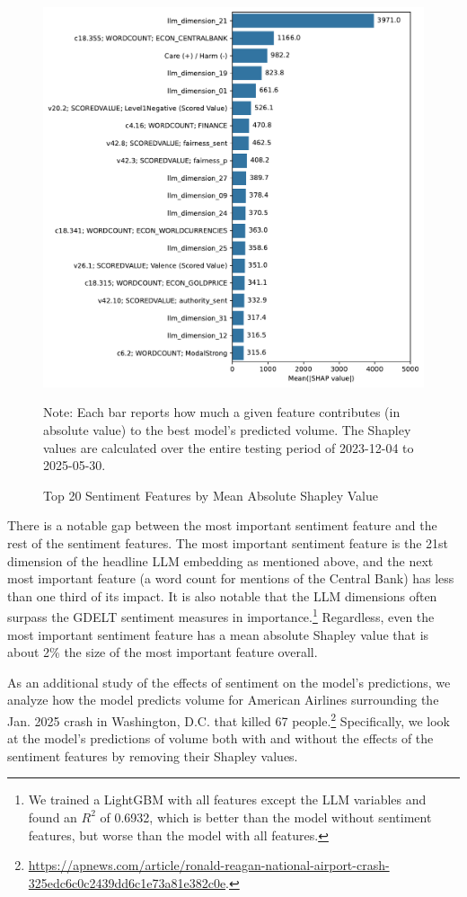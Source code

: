 \documentclass[12pt]{article}
\begin{document}
\begin{figure}[H]
    \centering
    \caption{Top 20 Sentiment Features by Mean Absolute Shapley Value}
    \includegraphics[width=0.75\linewidth]{../Output/shap_abs_sentiment_top20.pdf}
    \begin{minipage}{0.75\linewidth}
        \footnotesize
        \singlespacing
        Note: Each bar reports how much a given feature contributes (in absolute value) to the best model's predicted volume. The Shapley values are calculated over the entire testing period of 2023-12-04 to 2025-05-30.
    \end{minipage}
    \label{fig:shapley_sentiment_top20}
\end{figure}

There is a notable gap between the most important sentiment feature and the rest of the sentiment features. The most important sentiment feature is the 21st dimension of the headline LLM embedding as mentioned above, and the next most important feature (a word count for mentions of the Central Bank) has less than one third of its impact. It is also notable that the LLM dimensions often surpass the GDELT sentiment measures in importance.\footnote{We trained a LightGBM with all features except the LLM variables and found an $R^2$ of 0.6932, which is better than the model without sentiment features, but worse than the model with all features.} Regardless, even the most important sentiment feature has a mean absolute Shapley value that is about 2\% the size of the most important feature overall.

As an additional study of the effects of sentiment on the model's predictions, we analyze how the model predicts volume for American Airlines surrounding the Jan. 2025 crash in Washington, D.C. that killed 67 people.\footnote{\url{https://apnews.com/article/ronald-reagan-national-airport-crash-325edc6c0c2439dd6c1e73a81e382c0e}.} Specifically, we look at the model's predictions of volume both with and without the effects of the sentiment features by removing their Shapley values.
\end{document}
